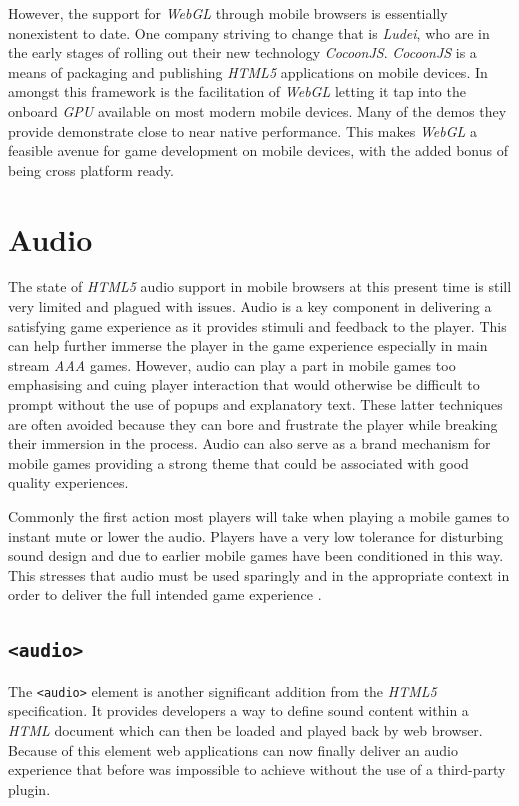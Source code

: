 \documentclass[final]{cmpreport}
\begin{document}
However, the support for \textit{WebGL} through mobile browsers is essentially nonexistent to date. One company striving to change that is \textit{Ludei}, who are in the early stages of rolling out their new technology \textit{CocoonJS}. \textit{CocoonJS} is a means of packaging and publishing \textit{HTML5} applications on mobile devices. In amongst this framework is the facilitation of \textit{WebGL} letting it tap into the onboard \textit{GPU} available on most modern mobile devices. Many of the demos they provide demonstrate close to near native performance. This makes \textit{WebGL} a feasible avenue for game development on mobile devices, with the added bonus of being cross platform ready.

\section{Audio}
The state of \textit{HTML5} audio support in mobile browsers at this present time is still very limited and plagued with issues. Audio is a key component in delivering a satisfying game experience as it provides stimuli and feedback to the player. This can help further immerse the player in the game experience especially in main stream \textit{AAA} games. However, audio can play a part in mobile games too emphasising and cuing player interaction that would otherwise be difficult to prompt without the use of popups and explanatory text. These latter techniques are often avoided because they can bore and frustrate the player while breaking their immersion in the process. Audio can also serve as a brand mechanism for mobile games providing a strong theme that could be associated with good quality experiences.

Commonly the first action most players will take when playing a mobile games to instant mute or lower the audio. Players have a very low tolerance for disturbing sound design and due to earlier mobile games have been conditioned in this way. This stresses that audio must be used sparingly and in the appropriate context in order to deliver the full intended game experience \cite{Thomas}.

\subsection{\texttt{<audio>}}
The \texttt{<audio>} element is another significant addition from the \textit{HTML5} specification. It provides developers a way to define sound content within a \textit{HTML} document which can then be loaded and played back by web browser. Because of this element web applications can now finally deliver an audio experience that before was impossible to achieve without the use of a third-party plugin.
\end{document}
